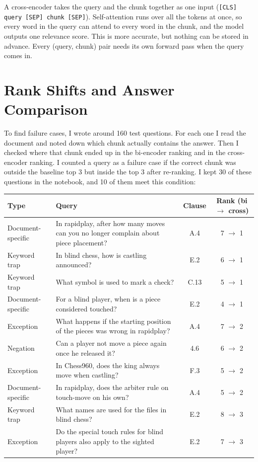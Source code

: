 \documentclass[11pt,a4paper]{article}
\begin{document}
A cross-encoder takes the query and the chunk together as one input (\texttt{[CLS] query [SEP] chunk [SEP]}). Self-attention runs over all the tokens at once, so every word in the query can attend to every word in the chunk, and the model outputs one relevance score. This is more accurate, but nothing can be stored in advance. Every (query, chunk) pair needs its own forward pass when the query comes in.

\section{Rank Shifts and Answer Comparison}

To find failure cases, I wrote around 160 test questions. For each one I read the document and noted down which chunk actually contains the answer. Then I checked where that chunk ended up in the bi-encoder ranking and in the cross-encoder ranking. I counted a query as a failure case if the correct chunk was outside the baseline top 3 but inside the top 3 after re-ranking. I kept 30 of these questions in the notebook, and 10 of them meet this condition:

\begin{center}
\small
\begin{tabularx}{\textwidth}{@{}l Y c c@{}}
\toprule
Type & Query & Clause & Rank (bi $\rightarrow$ cross) \\
\midrule
Document-specific & In rapidplay, after how many moves can you no longer complain about piece placement? & A.4 & 7 $\rightarrow$ 1 \\
Keyword trap      & In blind chess, how is castling announced? & E.2 & 6 $\rightarrow$ 1 \\
Keyword trap      & What symbol is used to mark a check? & C.13 & 5 $\rightarrow$ 1 \\
Document-specific & For a blind player, when is a piece considered touched? & E.2 & 4 $\rightarrow$ 1 \\
Exception         & What happens if the starting position of the pieces was wrong in rapidplay? & A.4 & 7 $\rightarrow$ 2 \\
Negation          & Can a player not move a piece again once he released it? & 4.6 & 6 $\rightarrow$ 2 \\
Exception         & In Chess960, does the king always move when castling? & F.3 & 5 $\rightarrow$ 2 \\
Document-specific & In rapidplay, does the arbiter rule on touch-move on his own? & A.4 & 5 $\rightarrow$ 2 \\
Keyword trap      & What names are used for the files in blind chess? & E.2 & 8 $\rightarrow$ 3 \\
Exception         & Do the special touch rules for blind players also apply to the sighted player? & E.2 & 7 $\rightarrow$ 3 \\
\bottomrule
\end{tabularx}
\end{center}
\end{document}
